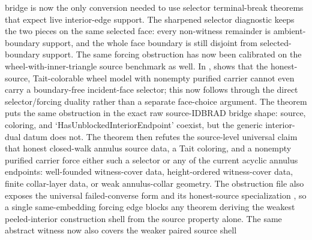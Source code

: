 \documentclass[11pt]{article}
\begin{document}
bridge
is now the only conversion needed to use selector terminal-break theorems that
expect live interior-edge support.  The sharpened selector diagnostic
keeps the two pieces on the same selected face: every non-witness remainder is
ambient-boundary support, and the whole face boundary is still disjoint from
selected-boundary support.  The same
forcing obstruction has now been calibrated on the wheel-with-inner-triangle
source benchmark as well.  In
,
shows that the honest-source, Tait-colorable wheel model with nonempty purified
carrier cannot even carry a boundary-free incident-face selector; this now
follows through the direct selector/forcing duality rather than a separate
face-choice argument.  The theorem
puts the same obstruction in the exact raw source-IDBRAD bridge shape: source,
coloring, and `HasUnblockedInteriorEndpoint' coexist, but the generic
interior-dual datum does not.  The theorem
then refutes the source-level universal claim that honest closed-walk annulus
source data, a Tait coloring, and a nonempty purified carrier force either such
a selector or any of the current acyclic annulus endpoints: well-founded
witness-cover data, height-ordered witness-cover data, finite collar-layer
data, or weak annulus-collar geometry.
The obstruction file also exposes the universal
failed-converse form
and its honest-source specialization
,
so a single same-embedding forcing edge blocks any theorem deriving the weakest
peeled-interior construction shell from the source property alone.  The same
abstract witness now also covers the
weaker paired source shell
\end{document}
